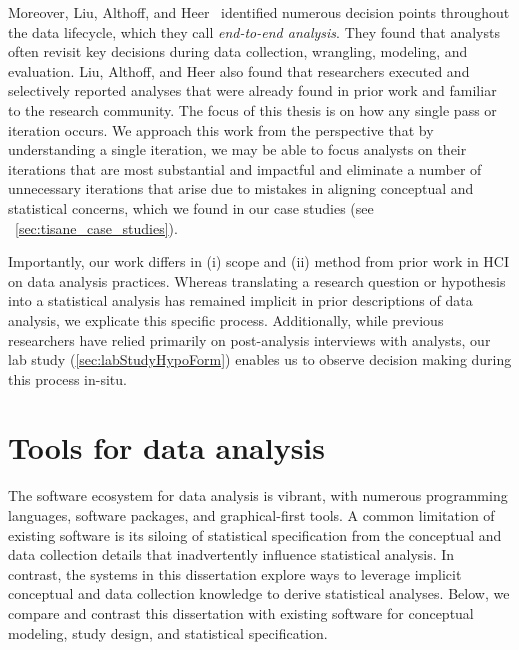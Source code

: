 Moreover, Liu, Althoff, and Heer~\cite{liu2019paths} identified numerous
decision points throughout the data lifecycle, which they call
\textit{end-to-end analysis}. They found that analysts often revisit key
decisions during data collection, wrangling, modeling, and evaluation. Liu,
Althoff, and Heer also found that researchers executed and selectively reported
analyses that were already found in prior work and familiar to the research
community. The focus of this thesis is on how any single pass or iteration
occurs. We approach this work from the perspective that by understanding a
single iteration, we may be able to focus analysts on their iterations that are
most substantial and impactful and eliminate a number of unnecessary iterations
that arise due to mistakes in aligning conceptual and statistical concerns,
which we found in our case studies (see ~\autoref{sec:tisane_case_studies}).


Importantly, our work differs in (i) scope and (ii) method from prior work in
HCI on data analysis practices. Whereas translating a research question or
hypothesis into a statistical analysis has remained implicit in prior
descriptions of data analysis, we explicate this specific process. Additionally,
while previous researchers have relied primarily on post-analysis interviews
with analysts, our lab study (\autoref{sec:labStudyHypoForm}) enables us to observe
decision making during this process in-situ.



\section{Tools for data analysis}
The software ecosystem for data analysis is vibrant, with numerous programming
languages, software packages, and graphical-first tools. A common limitation of
existing software is its siloing of statistical specification from the
conceptual and data collection details that inadvertently influence statistical
analysis. In contrast, the systems in this dissertation explore ways to leverage
implicit conceptual and data collection knowledge to derive statistical
analyses. Below, we compare and contrast this dissertation with existing
software for conceptual modeling, study design, and statistical specification. 

